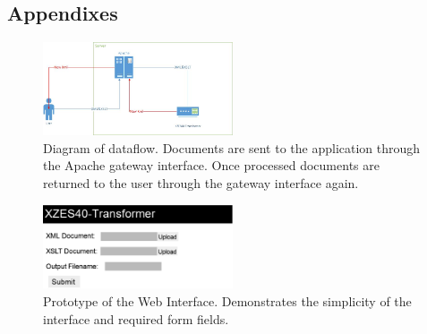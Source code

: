 \subsection{Appendixes}

% 
% 
% 
% 
% 

\begin{figure}[H]
  \centering
  \captionsetup{justification=centering,margin=2cm}
  \includegraphics[width=0.5\textwidth]{figures/document-flow-digram}
  \caption{
    Diagram of dataflow.
    Documents are sent to the application through the Apache gateway interface.
    Once processed documents are returned to the user through the gateway interface again.
  }
\end{figure}
        
\begin{figure}[H]
  \centering
  \captionsetup{justification=centering,margin=2cm}
  \includegraphics[width=0.5\textwidth]{figures/website-raw}
  \caption{
    Prototype of the Web Interface.
    Demonstrates the simplicity of the interface and required form fields.
  }
\end{figure}

